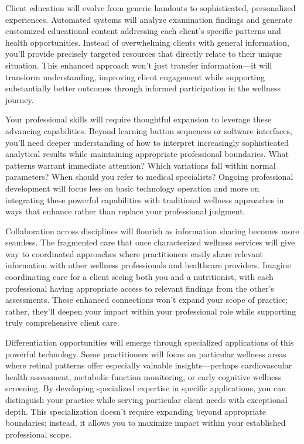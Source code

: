 \documentclass[
  Letterpaper,
]{scrbook}
\begin{document}
Client education will evolve from generic handouts to sophisticated,
personalized experiences. Automated systems will analyze examination
findings and generate customized educational content addressing each
client's specific patterns and health opportunities. Instead of
overwhelming clients with general information, you'll provide precisely
targeted resources that directly relate to their unique situation. This
enhanced approach won't just transfer information---it will transform
understanding, improving client engagement while supporting
substantially better outcomes through informed participation in the
wellness journey.

Your professional skills will require thoughtful expansion to leverage
these advancing capabilities. Beyond learning button sequences or
software interfaces, you'll need deeper understanding of how to
interpret increasingly sophisticated analytical results while
maintaining appropriate professional boundaries. What patterns warrant
immediate attention? Which variations fall within normal parameters?
When should you refer to medical specialists? Ongoing professional
development will focus less on basic technology operation and more on
integrating these powerful capabilities with traditional wellness
approaches in ways that enhance rather than replace your professional
judgment.

Collaboration across disciplines will flourish as information sharing
becomes more seamless. The fragmented care that once characterized
wellness services will give way to coordinated approaches where
practitioners easily share relevant information with other wellness
professionals and healthcare providers. Imagine coordinating care for a
client seeing both you and a nutritionist, with each professional having
appropriate access to relevant findings from the other's assessments.
These enhanced connections won't expand your scope of practice; rather,
they'll deepen your impact within your professional role while
supporting truly comprehensive client care.

Differentiation opportunities will emerge through specialized
applications of this powerful technology. Some practitioners will focus
on particular wellness areas where retinal patterns offer especially
valuable insights---perhaps cardiovascular health assessment, metabolic
function monitoring, or early cognitive wellness screening. By
developing specialized expertise in specific applications, you can
distinguish your practice while serving particular client needs with
exceptional depth. This specialization doesn't require expanding beyond
appropriate boundaries; instead, it allows you to maximize impact within
your established professional scope.
\end{document}
